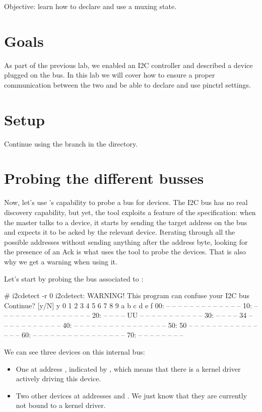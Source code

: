 {Objective: learn how to declare and use a muxing state.}

\section{Goals}

As part of the previous lab, we enabled an I2C controller and described
a device plugged on the bus. In this lab we will cover how to ensure a
proper communication between the two and be able to declare and use
pinctrl settings.

\section{Setup}

Continue using the  branch in the
 directory.

\section{Probing the different busses}

Now, let's use 's capability to probe a bus for
devices. The I2C bus has no real discovery capability, but yet, the tool
exploits a feature of the specification: when the master talks to a
device, it starts by sending the target address on the bus and expects
it to be acked by the relevant device. Iterating through all the
possible addresses without sending anything after the address byte,
looking for the presence of an Ack is what uses the tool to probe the
devices. That is also why we get a warning when using it.

Let's start by probing the bus associated to :

\begin{bashinput}
# i2cdetect -r 0
i2cdetect: WARNING! This program can confuse your I2C bus
Continue? [y/N] y
     0  1  2  3  4  5  6  7  8  9  a  b  c  d  e  f
00:          -- -- -- -- -- -- -- -- -- -- -- -- --
10: -- -- -- -- -- -- -- -- -- -- -- -- -- -- -- --
20: -- -- -- -- UU -- -- -- -- -- -- -- -- -- -- --
30: -- -- -- -- 34 -- -- -- -- -- -- -- -- -- -- --
40: -- -- -- -- -- -- -- -- -- -- -- -- -- -- -- --
50: 50 -- -- -- -- -- -- -- -- -- -- -- -- -- -- --
60: -- -- -- -- -- -- -- -- -- -- -- -- -- -- -- --
70: -- -- -- -- -- -- -- --
\end{bashinput}

We can see three devices on this internal bus:
\begin{itemize}
\item One at address , indicated by ,
      which means that there is a kernel driver actively
      driving this device.
\item Two other devices at addresses  and .
      We just know that they are currently not bound to a kernel driver.
\end{itemize}

